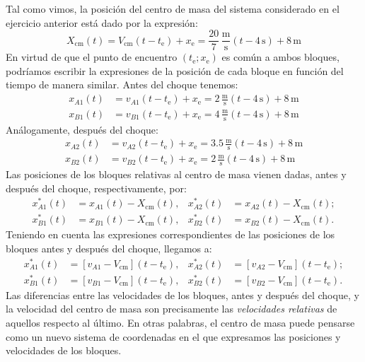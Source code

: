 \documentclass[addpoints]{exam}
\begin{document}
\begin{questions}
    \begin{solution}
    Tal como vimos, la posición del centro de masa del sistema considerado en el ejercicio anterior está dado por la expresión: $$X_\text{cm} (t) = V_\text{cm} \left(t - t_\text{e}\right) + x_\text{e} = \frac{20}{7} \, \frac{\text{m}}{\text{s}} \left(t - 4 \, \text{s}\right) + 8 \, \text{m}$$ En virtud de que el punto de encuentro $(t_\text{e};x_\text{e})$ es común a ambos bloques, podríamos escribir la expresiones de la posición de cada bloque en función del tiempo de manera similar. Antes del choque tenemos:
    \begin{align*}
        x_{A1} (t) &= v_{A1} \left(t - t_\text{e}\right) + x_\text{e} = 2 \, \frac{\text{m}}{\text{s}} \left(t - 4 \, \text{s}\right) + 8 \,\text{m} \\
        x_{B1} (t) &= v_{B1} \left(t - t_\text{e}\right) + x_\text{e} = 4 \, \frac{\text{m}}{\text{s}} \left(t - 4 \, \text{s}\right) + 8 \,\text{m}
    \end{align*} Análogamente, después del choque:
    \begin{align*}
        x_{A2} (t) &= v_{A2} \left(t - t_\text{e}\right) + x_\text{e} = 3.5 \, \frac{\text{m}}{\text{s}} \left(t - 4 \, \text{s}\right) + 8 \,\text{m} \\
        x_{B2} (t) &= v_{B2} \left(t - t_\text{e}\right) + x_\text{e} = 2 \, \frac{\text{m}}{\text{s}} \left(t - 4 \, \text{s}\right) + 8 \,\text{m}
    \end{align*} Las posiciones de los bloques relativas al centro de masa vienen dadas, antes y después del choque, respectivamente, por:
    \begin{align*}
        x_{A1}^* (t) &= x_{A1} (t) - X_\text{cm} (t), & x_{A2}^* (t) &= x_{A2} (t) - X_\text{cm} (t); \\
        x_{B1}^* (t) &= x_{B1} (t) - X_\text{cm} (t), & x_{B2}^* (t) &= x_{B2} (t) - X_\text{cm} (t).
    \end{align*} Teniendo en cuenta las expresiones correspondientes de las posiciones de los bloques antes y después del choque, llegamos a:
    \begin{align*}
        x_{A1}^* (t) &= \left[v_{A1} - V_\text{cm}\right] \left(t - t_\text{e}\right), & x_{A2}^* (t) &= \left[v_{A2} - V_\text{cm}\right] \left(t - t_\text{e}\right); \\
        x_{B1}^* (t) &= \left[v_{B1} - V_\text{cm}\right] \left(t - t_\text{e}\right), & x_{B2}^* (t) &= \left[v_{B2} - V_\text{cm}\right] \left(t - t_\text{e}\right).
    \end{align*} Las diferencias entre las velocidades de los bloques, antes y después del choque, y la velocidad del centro de masa son precisamente las \emph{velocidades relativas} de aquellos respecto al último. En otras palabras, el centro de masa puede pensarse como un nuevo sistema de coordenadas en el que expresamos las posiciones y velocidades de los bloques.


\end{solution}
\end{questions}
\end{document}

